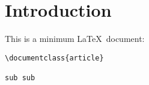 \section{Introduction}
This is a minimum \LaTeX\ document:
\begin{verbatim}
\documentclass{article}

sub sub

\end{verbatim}
